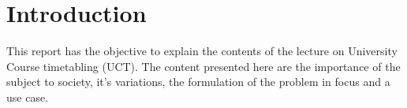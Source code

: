 \section{Introduction}

This report has the objective to explain the contents of the lecture on University Course timetabling (UCT). The content presented here are the importance of the subject to society, it's variations, the formulation of the problem in focus and a use case.

